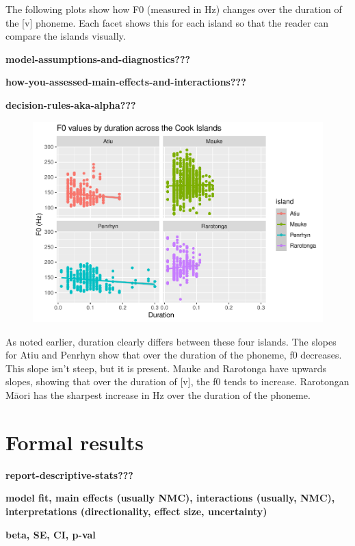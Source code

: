 \documentclass[
  ,man]{apa6}
\begin{document}
The following plots show how F0 (measured in Hz) changes over the duration of the {[}v{]} phoneme. Each facet shows this for each island so that the reader can compare the islands visually.

\textbf{model-assumptions-and-diagnostics???}

\textbf{how-you-assessed-main-effects-and-interactions???}

\textbf{decision-rules-aka-alpha???}

\begin{figure}
\includegraphics[width=1\linewidth]{cim_w_v_manuscript_files/figure-latex/f0-traj-mod-1} \caption{ }\label{fig:f0-traj-mod}
\end{figure}

As noted earlier, duration clearly differs between these four islands. The slopes for Atiu and Penrhyn show that over the duration of the phoneme, f0 decreases. This slope isn't steep, but it is present. Mauke and Rarotonga have upwards slopes, showing that over the duration of {[}v{]}, the f0 tends to increase. Rarotongan Māori has the sharpest increase in Hz over the duration of the phoneme.

\section{Formal results}\label{formal-results}

\textbf{report-descriptive-stats???}

\textbf{model fit, main effects (usually NMC), interactions (usually, NMC), interpretations (directionality, effect size, uncertainty)}

\textbf{beta, SE, CI, p-val}
\end{document}

